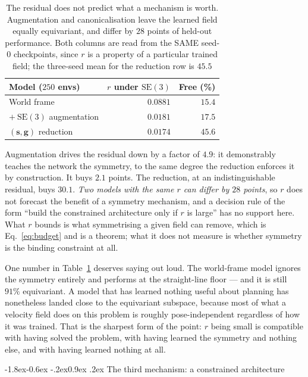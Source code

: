 \documentclass[10pt,twocolumn,letterpaper]{article}
\makeatletter
\newcommand{\toprule}{\hline}
\newcommand{\midrule}{\hline}
\newcommand{\bottomrule}{\hline}
\renewcommand\subsection{\@startsection{subsection}{2}{\z@}%
  {-1.8ex\@plus -0.6ex \@minus -.2ex}{0.9ex \@plus .2ex}%
  {\normalfont\normalsize\bfseries}}
\theoremstyle{plain}
\newcommand{\svec}{\mathbf{s}}
\newcommand{\gvec}{\mathbf{g}}
\newcommand{\SE}{\mathrm{SE}(3)}
\makeatother
\begin{document}
\begin{table}[t]
\centering
\small
\begin{tabular}{@{}l r r@{}}
\toprule
Model ($250$ envs) & $r$ under $\SE$ & Free (\%) \\
\midrule
World frame                  & $0.0881$ & $15.4$ \\
\quad $+\ \SE$ augmentation  & $0.0181$ & $17.5$ \\
$(\svec,\gvec)$ reduction    & $0.0174$ & $\mathbf{45.6}$ \\
\bottomrule
\end{tabular}
\caption{The residual does not predict what a mechanism is worth. Augmentation
and canonicalisation leave the learned field equally equivariant, and differ by
$28$ points of held-out performance. Both columns are read from the SAME seed-0
checkpoints, since $r$ is a property of a particular trained field; the
three-seed mean for the reduction row is $45.5$}
\label{tab:twosigns}
\end{table}

Augmentation drives the residual down by a factor of $4.9$: it demonstrably
teaches the network the symmetry, to the same degree the reduction enforces it
by construction. It buys $2.1$ points. The reduction, at an indistinguishable
residual, buys $30.1$. \emph{Two models with the same $r$ can differ by $28$
points}, so $r$ does not forecast the benefit of a symmetry mechanism, and a
decision rule of the form ``build the constrained architecture only if $r$ is
large'' has no support here. What $r$ bounds is what symmetrising a given field
can remove, which is Eq.~\eqref{eq:budget} and is a theorem; what it does not
measure is whether symmetry is the binding constraint at all.

One number in Table~\ref{tab:twosigns} deserves saying out loud. The world-frame
model ignores the symmetry entirely and performs at the straight-line floor --- and
it is still $91\%$ equivariant. A model that has learned nothing useful about
planning has nonetheless landed close to the equivariant subspace, because most
of what a velocity field does on this problem is roughly pose-independent
regardless of how it was trained. That is the sharpest form of the point: $r$
being small is compatible with having solved the problem, with having learned the
symmetry and nothing else, and with having learned nothing at all.

\subsection{The third mechanism: a constrained architecture}
\label{sec:arch}
\end{document}
